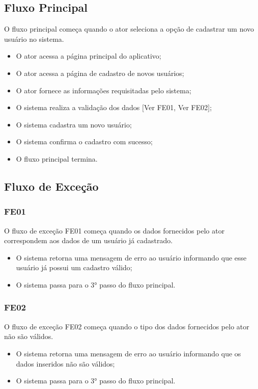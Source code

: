     \subsection{Fluxo Principal}
        O fluxo principal começa quando o ator seleciona a opção de cadastrar um novo usuário no sistema.
        \begin{itemize}
            \item O ator acessa a página principal do aplicativo;
            \item O ator acessa a página de cadastro de novos usuários;
            \item O ator fornece as informações requisitadas pelo sistema;
            \item O sistema realiza a validação dos dados [Ver FE01, Ver FE02];
            \item O sistema cadastra um novo usuário;
            \item O sistema confirma o cadastro com sucesso;
            \item O fluxo principal termina.
        \end{itemize}
    \subsection{Fluxo de Exceção}
        \subsubsection{FE01}
            O fluxo de exceção FE01 começa quando os dados fornecidos pelo ator correspondem aos dados de um usuário já cadastrado.
            \begin{itemize}
                \item O sistema retorna uma mensagem de erro ao usuário informando que esse usuário já possui um cadastro válido;
                \item O sistema passa para o 3° passo do fluxo principal.
            \end{itemize}
        \subsubsection{FE02}
            O fluxo de exceção FE02 começa quando o tipo dos dados fornecidos pelo ator não são válidos.
            \begin{itemize}
                \item O sistema retorna uma mensagem de erro ao usuário informando que os dados inseridos não são válidos;
                \item O sistema passa para o 3° passo do fluxo principal.
            \end{itemize}

